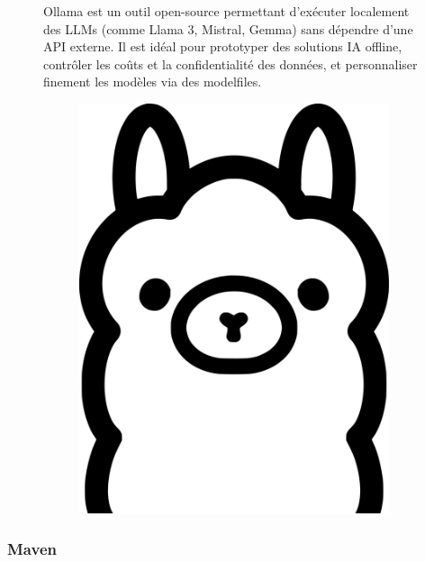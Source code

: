 \documentclass[12pt,a4paper]{report}
\begin{document}
	\begin{figure}[H]
		\begin{minipage}{0.8\textwidth}
			Ollama est un outil open-source permettant d’exécuter localement des LLMs (comme Llama 3, Mistral, Gemma) sans dépendre d’une API externe. Il est idéal pour prototyper des solutions IA offline, contrôler les coûts et la confidentialité des données, et personnaliser finement les modèles via des modelfiles.
		\end{minipage}
		\hfill
		\begin{minipage}{0.15\textwidth} 
			\begin{figure}[H]
				\centering
				\includegraphics[width=\linewidth]{ollama-logo.png}
				\label{fig:ollama-logo}
			\end{figure}
		\end{minipage}
	\end{figure}
	
	\subsubsection{Maven}
	
\end{document}
